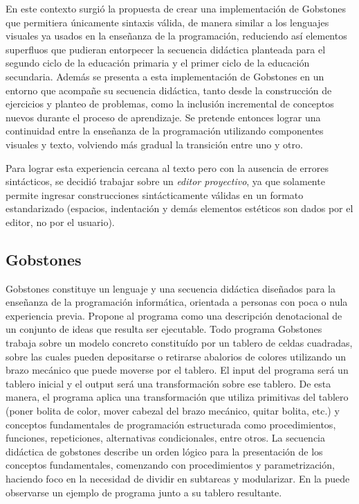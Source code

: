 En este contexto surgió la propuesta de crear una implementación de Gobstones que permitiera únicamente sintaxis válida, de manera similar a los lenguajes visuales ya usados en la enseñanza de la programación, reduciendo así elementos superfluos que pudieran entorpecer la secuencia didáctica planteada para el segundo ciclo de la educación primaria y el primer ciclo de la educación secundaria.
Además se presenta a esta implementación de Gobstones en un entorno que acompañe su secuencia didáctica, tanto desde la construcción de ejercicios y planteo de problemas, como la inclusión incremental de conceptos nuevos durante el proceso de aprendizaje. Se pretende entonces lograr una continuidad entre la enseñanza de la programación utilizando componentes visuales y texto, volviendo más gradual la transición entre uno y otro.

Para lograr esta experiencia cercana al texto pero con la ausencia de errores sintácticos, se decidió trabajar sobre un \emph{editor proyectivo}, ya que solamente permite ingresar construcciones sintácticamente válidas en un formato estandarizado (espacios, indentación y demás elementos estéticos son dados por el editor, no por el usuario).

\subsection{Gobstones}

Gobstones constituye un lenguaje y una secuencia didáctica diseñados para la enseñanza de la programación informática, orientada a personas con poca o nula experiencia previa. Propone al programa como una descripción denotacional de un conjunto de ideas que resulta ser ejecutable.
Todo programa Gobstones trabaja sobre un modelo concreto constituído por un tablero de celdas cuadradas, sobre las cuales pueden depositarse o retirarse abalorios de colores utilizando un brazo mecánico que puede moverse por el tablero. El input del programa será un tablero inicial y el output será una transformación sobre ese tablero. De esta manera, el programa aplica una transformación que utiliza primitivas del tablero (poner bolita de color, mover cabezal del brazo mecánico, quitar bolita, etc.) y conceptos fundamentales de programación estructurada como procedimientos, funciones, repeticiones, alternativas condicionales, entre otros.
La secuencia didáctica de gobstones describe un orden lógico para la presentación de los conceptos fundamentales, comenzando con procedimientos y parametrización, haciendo foco en la necesidad de dividir en subtareas y modularizar. En la  puede observarse un ejemplo de programa junto a su tablero resultante.

